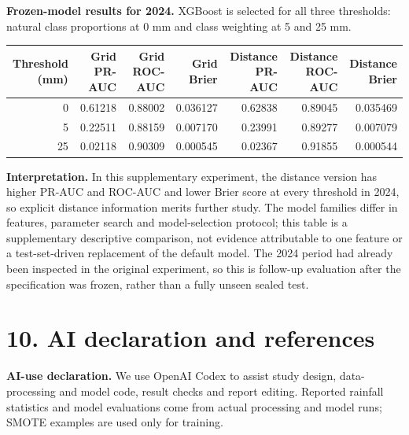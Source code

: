 \documentclass[UTF8,fontset=fandol,10pt,a4paper,landscape]{ctexart}
\begin{document}
\textbf{Frozen-model results for 2024.} XGBoost is selected for all three thresholds: natural class proportions at 0 mm and class weighting at 5 and 25 mm.

\begin{center}\small
\begin{tabular}{r|rrr|rrr}\toprule
Threshold (mm) & Grid PR-AUC & Grid ROC-AUC & Grid Brier & Distance PR-AUC & Distance ROC-AUC & Distance Brier\\\midrule
0 & 0.61218 & 0.88002 & 0.036127 & 0.62838 & 0.89045 & 0.035469\\
5 & 0.22511 & 0.88159 & 0.007170 & 0.23991 & 0.89277 & 0.007079\\
25 & 0.02118 & 0.90309 & 0.000545 & 0.02367 & 0.91855 & 0.000544\\
\bottomrule\end{tabular}
\end{center}

\textbf{Interpretation.} In this supplementary experiment, the distance version has higher PR-AUC and ROC-AUC and lower Brier score at every threshold in 2024, so explicit distance information merits further study. The model families differ in features, parameter search and model-selection protocol; this table is a supplementary descriptive comparison, not evidence attributable to one feature or a test-set-driven replacement of the default model. The 2024 period had already been inspected in the original experiment, so this is follow-up evaluation after the specification was frozen, rather than a fully unseen sealed test.
\clearpage\section*{10. AI declaration and references}

\textbf{AI-use declaration.} We use OpenAI Codex to assist study design, data-processing and model code, result checks and report editing. Reported rainfall statistics and model evaluations come from actual processing and model runs; SMOTE examples are used only for training.
\end{document}
